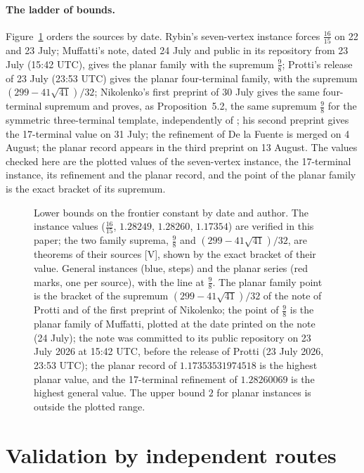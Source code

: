 \documentclass[11pt]{article}
\theoremstyle{remark}
\begin{document}
\paragraph{The ladder of bounds.} Figure~\ref{fig:ladder} orders the sources by date. Rybin's seven-vertex instance forces $\tfrac{16}{15}$ on 22 and 23 July; Muffatti's note, dated 24 July and public in its repository from 23 July (15:42 UTC), gives the planar family with the supremum $\tfrac98$; Protti's release of 23 July (23:53 UTC) gives the planar four-terminal family, with the supremum $(299-41\sqrt{41})/32$; Nikolenko's first preprint of 30 July gives the same four-terminal supremum and proves, as Proposition~5.2, the same supremum $\tfrac98$ for the symmetric three-terminal template, independently of \cite{Muf26}; his second preprint gives the 17-terminal value on 31 July; the refinement of De la Fuente is merged on 4 August; the planar record appears in the third preprint on 13 August. The values checked here are the plotted values of the seven-vertex instance, the 17-terminal instance, its refinement and the planar record, and the point of the
planar family is the exact bracket of its supremum.

\begin{figure}[t]
\centering

\caption{Lower bounds on the frontier constant by date and author. The instance values ($\tfrac{16}{15}$, $1.28249$, $1.28260$, $1.17354$) are verified in this paper; the two family suprema, $\tfrac98$ and $(299-41\sqrt{41})/32$, are theorems of their sources [V], shown by the exact bracket of their value. General instances (blue, steps) and the planar series (red marks, one per source), with the line at $\tfrac98$. The planar family point is the bracket of the supremum $(299-41\sqrt{41})/32$ of the note of Protti and of the first preprint of Nikolenko; the point of $\tfrac98$ is the planar family of Muffatti, plotted at the date printed on the note (24 July); the note was committed to its public repository on 23 July 2026 at 15:42 UTC, before the release of Protti (23 July 2026, 23:53 UTC); the planar record of $1.17353531974518$ is the highest planar value, and the 17-terminal refinement of $1.28260069$ is the highest general value. The upper bound $2$ for planar instances is outside the plotted range.}
\label{fig:ladder}
\end{figure}

\section{Validation by independent routes}
\label{sec:validation}
\end{document}
